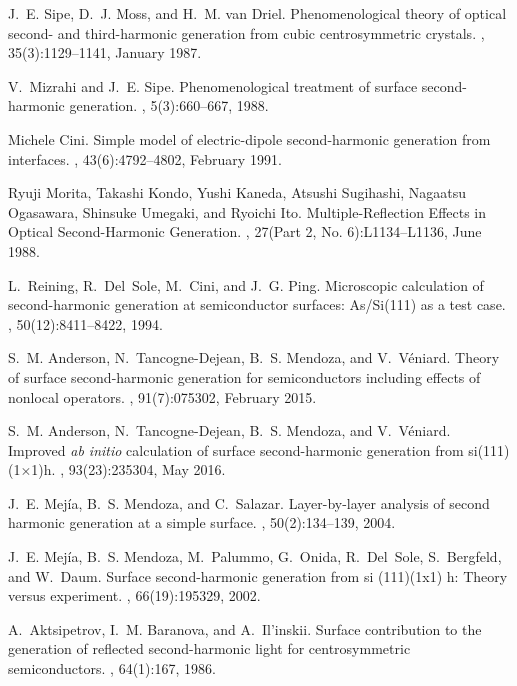 \documentclass[aps,prb,10pt,showpacs,letterpaper,twocolumn]{revtex4-1}
\begin{document}
\begin{thebibliography}{10}
J.~E. Sipe, D.~J. Moss, and H.~M. van Driel.
\newblock Phenomenological theory of optical second- and third-harmonic
  generation from cubic centrosymmetric crystals.
, 35(3):1129--1141, January 1987.

V.~Mizrahi and J.~E. Sipe.
\newblock Phenomenological treatment of surface second-harmonic generation.
, 5(3):660--667, 1988.

Michele Cini.
\newblock Simple model of electric-dipole second-harmonic generation from
  interfaces.
, 43(6):4792--4802, February 1991.

Ryuji Morita, Takashi Kondo, Yushi Kaneda, Atsushi Sugihashi, Nagaatsu
  Ogasawara, Shinsuke Umegaki, and Ryoichi Ito.
\newblock Multiple-{Reflection} {Effects} in {Optical} {Second}-{Harmonic}
  {Generation}.
, 27(Part 2, No.
  6):L1134--L1136, June 1988.

L.~Reining, R.~Del~Sole, M.~Cini, and J.~G. Ping.
\newblock Microscopic calculation of second-harmonic generation at
  semiconductor surfaces: {As/Si(111)} as a test case.
, 50(12):8411--8422, 1994.

S.~M. Anderson, N.~Tancogne-Dejean, B.~S. Mendoza, and V.~V{\'e}niard.
\newblock Theory of surface second-harmonic generation for semiconductors
  including effects of nonlocal operators.
, 91(7):075302, February 2015.

S.~M. Anderson, N.~Tancogne-Dejean, B.~S. Mendoza, and V.~V{\'e}\-niard.
\newblock Improved \emph{ab initio} calculation of surface second-harmonic
  generation from si(111)(1{$\times$}1)h.
, 93(23):235304, May 2016.

J.~E. Mej{\'i}a, B.~S. Mendoza, and C.~Salazar.
\newblock Layer-by-layer analysis of second harmonic generation at a simple
  surface.
, 50(2):134--139, 2004.

J.~E. Mej{\'i}a, B.~S. Mendoza, M.~Palummo, G.~Onida, R.~Del~Sole, S.~Bergfeld,
  and W.~Daum.
\newblock Surface second-harmonic generation from si (111)(1x1) h: Theory
  versus experiment.
, 66(19):195329, 2002.

A.~Aktsipetrov, I.~M. Baranova, and A.~Il'inskii.
\newblock Surface contribution to the generation of reflected second-harmonic
  light for centrosymmetric semiconductors.
, 64(1):167, 1986.


\end{thebibliography}
\end{document}
